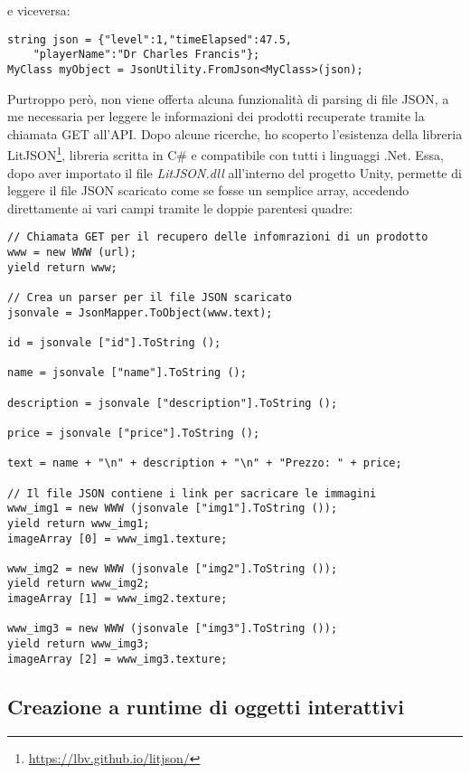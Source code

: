 e viceversa:

\begin{lstlisting}[style=MyCStyle]
string json = {"level":1,"timeElapsed":47.5,
	"playerName":"Dr Charles Francis"};
MyClass myObject = JsonUtility.FromJson<MyClass>(json);
\end{lstlisting}

Purtroppo però, non viene offerta alcuna funzionalità di parsing di file JSON, a me necessaria per leggere le informazioni dei prodotti recuperate tramite la chiamata GET all'API. Dopo alcune ricerche, ho scoperto l'esistenza della libreria LitJSON\footnote[4]{\url{https://lbv.github.io/litjson/}}, libreria scritta in C\# e compatibile con tutti i linguaggi .Net. Essa, dopo aver importato il file \textit{LitJSON.dll} all'interno del progetto Unity, permette di leggere il file JSON scaricato come se fosse un semplice array, accedendo direttamente ai vari campi tramite le doppie parentesi quadre:

\begin{lstlisting}[style=MyCStyle]
// Chiamata GET per il recupero delle infomrazioni di un prodotto
www = new WWW (url);
yield return www;

// Crea un parser per il file JSON scaricato
jsonvale = JsonMapper.ToObject(www.text);

id = jsonvale ["id"].ToString ();

name = jsonvale ["name"].ToString ();

description = jsonvale ["description"].ToString ();

price = jsonvale ["price"].ToString ();

text = name + "\n" + description + "\n" + "Prezzo: " + price;

// Il file JSON contiene i link per sacricare le immagini
www_img1 = new WWW (jsonvale ["img1"].ToString ());
yield return www_img1;
imageArray [0] = www_img1.texture;

www_img2 = new WWW (jsonvale ["img2"].ToString ());
yield return www_img2;
imageArray [1] = www_img2.texture;

www_img3 = new WWW (jsonvale ["img3"].ToString ());
yield return www_img3;
imageArray [2] = www_img3.texture;
\end{lstlisting}

\subsection{Creazione a runtime di oggetti interattivi}


